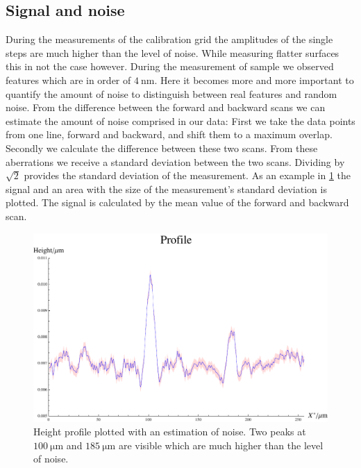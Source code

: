 \documentclass[paper=a4,fontsize=10pt,DIV=18,twocolumn,parskip=half]{scrartcl}
\numberwithin{equation}{section}    %
\begin{document}
\subsection{Signal and noise}
\label{san}
During the measurements of the calibration grid the amplitudes of the single 
steps are much higher than the level of noise. While measuring flatter surfaces 
this in not the case however. During the measurement of sample  
we observed features which are in order of $\SI{4}{\nano\meter}$.  Here it 
becomes more and more important to quantify the amount of noise to distinguish 
between real features and random noise.
From the difference between the forward and backward scans we can estimate the 
amount of noise comprised in our data: First we take the data points from one 
line, forward and backward, and shift them to a maximum overlap. Secondly we 
calculate the difference between these two scans. From these aberrations we 
receive a standard deviation between the two scans. Dividing by $\sqrt{2}$  
provides the standard deviation of the measurement.
As an example in \cref{noise} the signal and an area with the size of the 
measurement's standard deviation is plotted. The signal is calculated by the 
mean value of the forward and backward scan.

\begin{figure}
    \begin{center}
        \includegraphics[width=\columnwidth]{Bilder/sn_signal2}
        \caption{Height profile plotted with an estimation of noise. Two peaks 
        at $\SI{100}{\micro\meter}$ and $\SI{185}{\micro\meter}$ are visible 
        which are much higher than the level of noise. }
        \label{noise}
    \end{center}
\end{figure}
\end{document}
